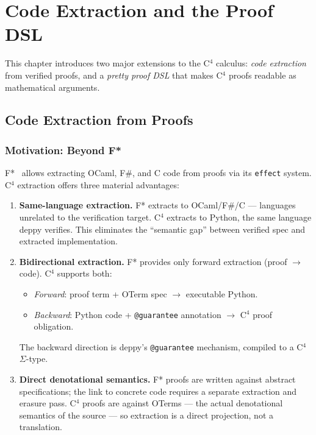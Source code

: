 \chapter{Code Extraction and the Proof DSL}
\label{ch:extraction}

This chapter introduces two major extensions to the C$^4$ calculus:
\emph{code extraction} from verified proofs, and a \emph{pretty proof DSL}
that makes C$^4$ proofs readable as mathematical arguments.

\section{Code Extraction from Proofs}

\subsection{Motivation: Beyond F*}

F*~\cite{swamy2016} allows extracting OCaml, F\#, and C code from proofs
via its \texttt{effect} system.  C$^4$ extraction offers three material
advantages:

\begin{enumerate}
  \item \textbf{Same-language extraction.}  F* extracts to OCaml/F\#/C —
    languages unrelated to the verification target.  C$^4$ extracts to
    Python, the same language deppy verifies.  This eliminates the
    ``semantic gap'' between verified spec and extracted implementation.

  \item \textbf{Bidirectional extraction.}  F* provides only forward
    extraction (proof $\to$ code).  C$^4$ supports both:
    \begin{itemize}
      \item \emph{Forward}: proof term + OTerm spec $\to$ executable Python.
      \item \emph{Backward}: Python code + \texttt{@guarantee} annotation
            $\to$ C$^4$ proof obligation.
    \end{itemize}
    The backward direction is deppy's \texttt{@guarantee} mechanism,
    compiled to a C$^4$ $\Sigma$-type.

  \item \textbf{Direct denotational semantics.}  F* proofs are written
    against abstract specifications; the link to concrete code requires
    a separate extraction and erasure pass.  C$^4$ proofs are against
    OTerms — the actual denotational semantics of the source — so
    extraction is a direct projection, not a translation.
\end{enumerate}

